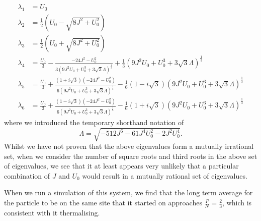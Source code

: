\documentclass[a4paper, 10pt]{article}
\theoremstyle{plain}
\begin{document}
\begin{align*}
    \lambda_{1}
    &=
    U_{0}
    \\
    \lambda_{2}
    &=
    \frac{1}{2} \left(U_{0} - \sqrt{8J^2 + U_{0}^2}\right)
    \\
    \lambda_{3}
    &=
    \frac{1}{2}(U_{0} + \sqrt{8J^2 + U_{0}^2})
    \\
    \lambda_{4}
    &=
    \frac{U_{0}}{3} -
    \frac{-24 J^{2} - U_{0}^2}
         {
          3 \left (
                9 J^{2} U_{0} + U_{0}^3 + 3 \sqrt{3} \Lambda
            \right)^{\frac{1}{3}}}
    +
    \frac{1}{3}
    \left ( 9 J^{2} U_{0} + U_{0}^{3} + 3\sqrt{3} \Lambda \right )^{\frac{1}{3}}
    \\
    \lambda_{5}
    &=
    \frac{U_{0}}{3} +
    \frac{(1 + i \sqrt{3})(-24 J^{2} - U_{0}^{2})}
         {6
          \left (
              9 J^{2} U_{0} + U_{0}^{3} + 3 \sqrt{3} \Lambda
          \right )^{\frac{1}{3}}
         }
    -
    \frac{1}{6} (1 - i \sqrt{3})
    \left (
        9 J^{2} U_{0} + U_{0}^{3} +
        3 \sqrt{3} \Lambda
    \right )^{\frac{1}{3}}
    \\
    \lambda_{6}
    &=
    \frac{U_{0}}{3} +
    \frac{(1 - i\sqrt{3})(-24 J^{2} - U_{0}^{2})}
         {6
          \left (
              9 J^{2} U_{0} + U_{0}^{3} +
              3 \sqrt{3} \Lambda
          \right )^{\frac{1}{3}}
         }
    -
    \frac{1}{6} (1 + i\sqrt{3})
    \left (
        9 J^{2} U_{0} + U_{0}^{3} +
        3 \sqrt{3} \Lambda
    \right )^{\frac{1}{3}}
\end{align*}
where we introduced the temporary shorthand notation of
\begin{equation*}
    \Lambda = \sqrt{-512 J^{6} - 61 J^{4} U_{0}^{2} - 2 J^{2} U_{0}^{4}}.
\end{equation*}
Whilst we have not proven that the above eigenvalues form a mutually irrational
set, when we consider the number of square roots and third roots in the above
set of eigenvalues, we see that it at least appears very unlikely that a
particular combination of $J$ and $U_{0}$ would result in a mutually rational
set of eigenvalues.

When we run a simulation of this system, we find that the long term average
for the particle to be on the same site that it started on approaches
$\frac{P}{N}=\frac{2}{3}$, which is consistent with it thermalising.
\end{document}
